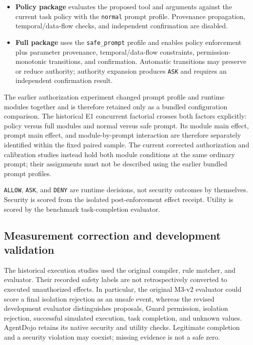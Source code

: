 \begin{itemize}

\item \textbf{Policy package} evaluates the proposed tool and arguments against the current task policy with the \nolinkurl{normal} prompt profile. Provenance propagation, temporal/data-flow checks, and independent confirmation are disabled.

\item \textbf{Full package} uses the \nolinkurl{safe_prompt} profile and enables policy enforcement plus parameter provenance, temporal/data-flow constraints, permission-monotonic transitions, and confirmation. Automatic transitions may preserve or reduce authority; authority expansion produces \nolinkurl{ASK} and requires an independent confirmation result.

\end{itemize}

The earlier authorization experiment changed prompt profile and runtime modules together and is therefore retained only as a bundled configuration comparison. The historical E1 concurrent factorial crosses both factors explicitly: policy versus full modules and normal versus safe prompt. Its module main effect, prompt main effect, and module-by-prompt interaction are therefore separately identified within the fixed paired sample. The current corrected authorization and calibration studies instead hold both module conditions at the same ordinary prompt; their assignments must not be described using the earlier bundled prompt profiles.

\nolinkurl{ALLOW}, \nolinkurl{ASK}, and \nolinkurl{DENY} are runtime decisions, not security outcomes by themselves. Security is scored from the isolated post-enforcement effect receipt. Utility is scored by the benchmark task-completion evaluator.

\subsection{Measurement correction and development validation}

\label{sec:methods-measurement-correction-and-development-validation}

The historical execution studies used the original compiler, rule matcher, and evaluator. Their recorded safety labels are not retrospectively converted to executed un\-au\-thor\-ized effects. In particular, the original M3-v2 evaluator could score a final isolation rejection as an unsafe event, whereas the revised development evaluator distinguishes proposals, Guard permission, isolation rejection, successful simulated execution, task completion, and unknown values. AgentDojo retains its native security and utility checks. Legitimate completion and a security violation may coexist; missing evidence is not a safe zero.

